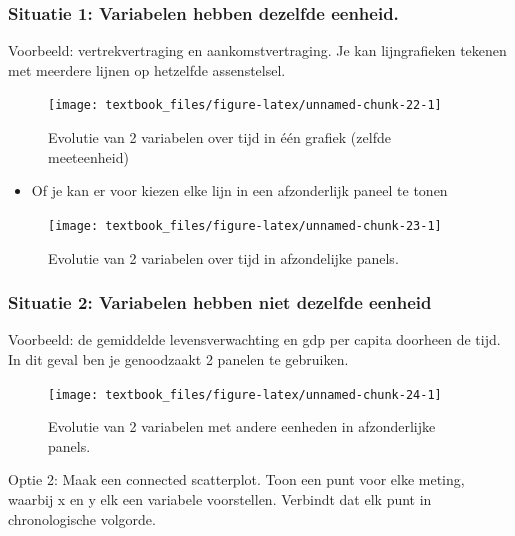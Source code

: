 \documentclass[]{tufte-book}
\providecommand{\tightlist}{%
  \setlength{\itemsep}{0pt}\setlength{\parskip}{0pt}}
\begin{document}
\hypertarget{situatie-1-variabelen-hebben-dezelfde-eenheid.}{%
\subsubsection{Situatie 1: Variabelen hebben dezelfde eenheid.}\label{situatie-1-variabelen-hebben-dezelfde-eenheid.}}

Voorbeeld: vertrekvertraging en aankomstvertraging. Je kan lijngrafieken tekenen met meerdere lijnen op hetzelfde assenstelsel.

\begin{figure}
\texttt{[image: textbook\_files/figure-latex/unnamed-chunk-22-1]} \caption[Evolutie van 2 variabelen over tijd in één grafiek (zelfde meeteenheid)]{Evolutie van 2 variabelen over tijd in één grafiek (zelfde meeteenheid)}\label{fig:unnamed-chunk-22}
\end{figure}

\begin{itemize}
\tightlist
\item
  Of je kan er voor kiezen elke lijn in een afzonderlijk paneel te tonen
\end{itemize}

\begin{figure}
\texttt{[image: textbook\_files/figure-latex/unnamed-chunk-23-1]} \caption[Evolutie van 2 variabelen over tijd in afzondelijke panels]{Evolutie van 2 variabelen over tijd in afzondelijke panels.}\label{fig:unnamed-chunk-23}
\end{figure}

\hypertarget{situatie-2-variabelen-hebben-niet-dezelfde-eenheid}{%
\subsubsection{Situatie 2: Variabelen hebben niet dezelfde eenheid}\label{situatie-2-variabelen-hebben-niet-dezelfde-eenheid}}

Voorbeeld: de gemiddelde levensverwachting en gdp per capita doorheen de tijd. In dit geval ben je genoodzaakt 2 panelen te gebruiken.

\begin{figure}
\texttt{[image: textbook\_files/figure-latex/unnamed-chunk-24-1]} \caption[Evolutie van 2 variabelen met andere eenheden in afzonderlijke panels]{Evolutie van 2 variabelen met andere eenheden in afzonderlijke panels.}\label{fig:unnamed-chunk-24}
\end{figure}

Optie 2: Maak een connected scatterplot. Toon een punt voor elke meting, waarbij x en y elk een variabele voorstellen. Verbindt dat elk punt in chronologische volgorde.
\end{document}
